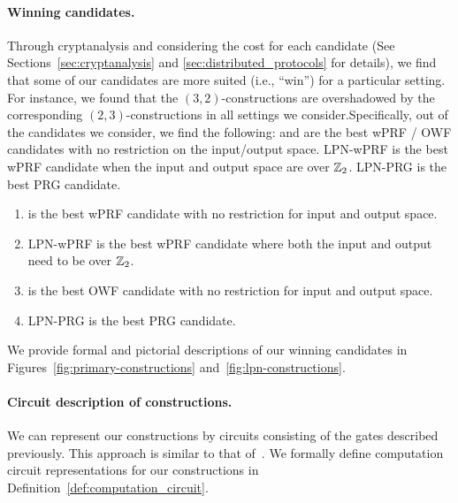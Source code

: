 \paragraph{Winning candidates.}
Through cryptanalysis and considering the cost for each candidate (See Sections~\ref{sec:cryptanalysis} and \ref{sec:distributed_protocols} for details), we find that some of our candidates are more suited (i.e., ``win'') for a particular setting. 
\iffull For instance, we found that the $(3,2)$-constructions are overshadowed by the corresponding $(2,3)$-constructions in all settings we consider.\fi Specifically, out of the candidates we consider, we find the following: \ttwPRF and \ttOWF are the best wPRF / OWF candidates with no restriction on the input/output space. LPN-wPRF is the best wPRF candidate when the input and output space are over $\mathbb{Z}_2$. LPN-PRG is the best PRG candidate.
\iffull
\begin{enumerate}
    \item \ttwPRF is the best wPRF candidate with no restriction for input and output space. 
    \item LPN-wPRF is the best wPRF candidate where both the input and output need to be over $\mathbb{Z}_2$.
    \item \ttOWF is the best OWF candidate with no restriction for input and output space.
    \item LPN-PRG is the best PRG candidate.
\end{enumerate}
\fi
We provide formal and pictorial descriptions of our winning candidates in Figures~\ref{fig:primary-constructions} and~\ref{fig:lpn-constructions}.

\iffull
\paragraph{Circuit description of constructions.}
We can represent our constructions by circuits consisting of the gates described previously. This approach is similar to that of~\cite{boyle2019-fss-preprocess}. We formally define computation circuit representations for our constructions in Definition~\ref{def:computation_circuit}.

